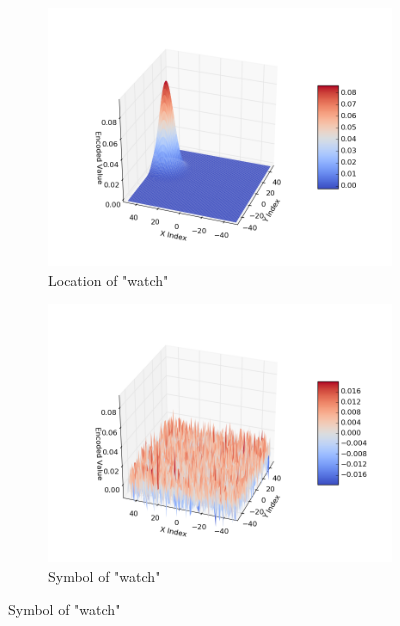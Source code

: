 \documentclass[a4paper,twoside]{article}
\begin{document}
\begin{figure}[th!]
		\begin{subfigure}{0.45\columnwidth}
			\center
			\includegraphics[width=\linewidth]{img/coord_example_1.png}
			\caption{Location of "watch"}
			\label{fig:encoding-coord}
		\end{subfigure}
		\begin{subfigure}{0.45\columnwidth}
			\center
			\includegraphics[width=\linewidth]{img/coord_example_2.png}
			\caption{Symbol of "watch"}
			\label{fig:encoding-object}
		\end{subfigure}
		

\end{figure}
\end{document}
